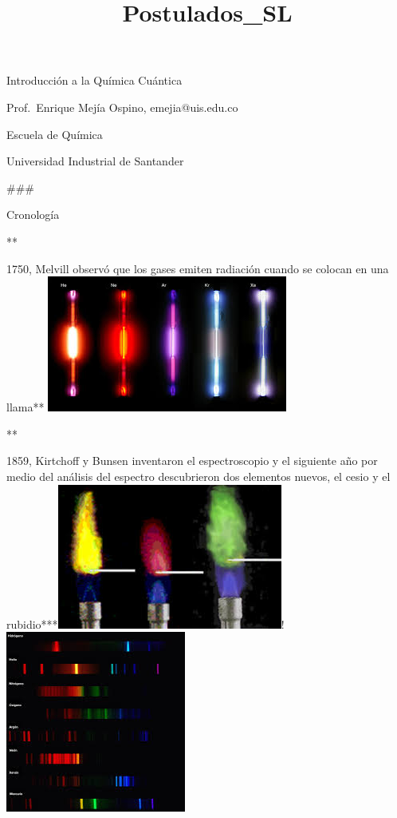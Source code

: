 \documentclass[11pt]{article}
\title{Postulados\_SL}
\begin{document}
    
    \maketitle
    
    

    
    Introducción a la Química Cuántica

Prof.~Enrique Mejía Ospino, emejia@uis.edu.co

Escuela de Química

Universidad Industrial de Santander

    \#\#\#

Cronología

    **

1750, Melvill observó que los gases emiten radiación cuando se colocan
en una llama** \includegraphics{gas_color.jpeg}

**

1859, Kirtchoff y Bunsen inventaron el espectroscopio y el siguiente año
por medio del análisis del espectro descubrieron dos elementos nuevos,
el cesio y el
rubidio***\includegraphics{elem2_color.jpeg}!\includegraphics{elem_lineas.jpeg}
\end{document}
